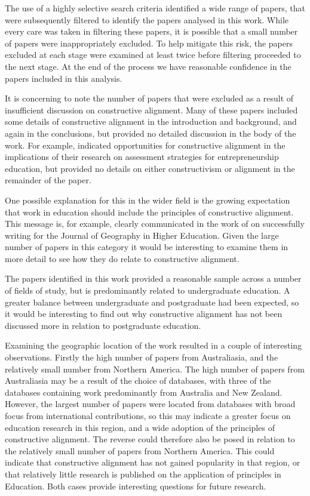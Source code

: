 The use of a highly selective search criteria identified a wide range of papers, that were subsequently filtered to identify the papers analysed in this work. While every care was taken in filtering these papers, it is possible that a small number of papers were inappropriately excluded. To help mitigate this risk, the papers excluded at each stage were examined at least twice before filtering proceeded to the next stage. At the end of the process we have reasonable confidence in the papers included in this analysis.

It is concerning to note the number of papers that were excluded as a result of insufficient discussion on constructive alignment. Many of these papers included some details of constructive alignment in the introduction and background, and again in the conclusions, but provided no detailed discussion in the body of the work. For example, \citet{Penaluna:EducationTraining:2009} indicated opportunities for constructive alignment in the implications of their research on assessment strategies for entrepreneurship education, but provided no details on either constructivism or alignment in the remainder of the paper. 

One possible explanation for this in the wider field is the growing expectation that work in education should include the principles of constructive alignment. This message is, for example, clearly communicated in the work of \citet{Haigh:2013} on successfully writing for the Journal of Geography in Higher Education. Given the large number of papers in this category it would be interesting to examine them in more detail to see how they do relate to constructive alignment. 

The papers identified in this work provided a reasonable sample across a number of fields of study, but is predominantly related to undergraduate education. A greater balance between undergraduate and postgraduate had been expected, so it would be interesting to find out why constructive alignment has not been discussed more in relation to postgraduate education.

Examining the geographic location of the work resulted in a couple of interesting observations. Firstly the high number of papers from Australiasia, and the relatively small number from Northern America. The high number of papers from Australiasia may be a result of the choice of databases, with three of the databases containing work predominantly from Australia and New Zealand. However, the largest number of papers were located from databases with broad focus from international contributions, so this may indicate a greater focus on education research in this region, and a wide adoption of the principles of constructive alignment. The reverse could therefore also be posed in relation to the relatively small number of papers from Northern America. This could indicate that constructive alignment has not gained popularity in that region, or that relatively little research is published on the application of principles in Education. Both cases provide interesting questions for future research.


